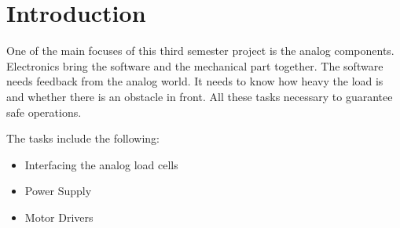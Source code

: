 \documentclass[../report.tex]{subfiles}
\begin{document}
\maketitle

\section*{Introduction}

One of the main focuses of this third semester project is the analog components. Electronics bring the software and the mechanical part together. 
The software needs feedback from the analog world. It needs to know how heavy the load is and
whether there is an obstacle in front. All these tasks necessary to guarantee safe operations.

\quad
The tasks include the following:

\begin{itemize}
    \item Interfacing the analog load cells
    \item Power Supply
    \item Motor Drivers
\end{itemize}
\end{document}
